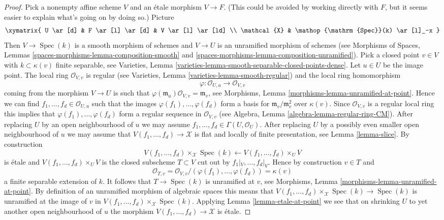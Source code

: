 \documentclass{stacks-project}
\theoremstyle{plain}
\theoremstyle{definition}
\theoremstyle{remark}
\numberwithin{equation}{subsection}
\def\Spec{\mathop{\mathrm{Spec}}}
\begin{document}
\begin{proof}
\medskip\noindent
Pick a nonempty affine scheme $V$ and an \'etale morphism $V \to F$.
(This could be avoided by working directly with $F$, but it seems easier
to explain what's going on by doing so.) Picture
$$
\xymatrix{
U \ar[d] & F  \ar[l] \ar[d] & V \ar[l] \ar[ld] \\
\mathcal{X} & \Spec(k) \ar[l]_-x
}
$$
Then $V \to \Spec(k)$ is a smooth morphism of schemes and $V \to U$ is an
unramified morphism of schemes (see
Morphisms of Spaces, Lemmas
\ref{spaces-morphisms-lemma-composition-smooth} and
\ref{spaces-morphisms-lemma-composition-unramified}).
Pick a closed point $v \in V$ with $k \subset \kappa(v)$ finite separable, see
Varieties, Lemma \ref{varieties-lemma-smooth-separable-closed-points-dense}.
Let $u \in U$ be the image point. The local ring
$\mathcal{O}_{V, v}$ is regular (see
Varieties, Lemma \ref{varieties-lemma-smooth-regular})
and the local ring homomorphism
$$
\varphi : \mathcal{O}_{U, u} \longrightarrow \mathcal{O}_{V, v}
$$
coming from the morphism $V \to U$ is such that
$\varphi(\mathfrak m_u)\mathcal{O}_{V, v} = \mathfrak m_v$, see
Morphisms, Lemma \ref{morphisms-lemma-unramified-at-point}.
Hence we can find $f_1, \ldots, f_d \in \mathcal{O}_{U, u}$
such that the images $\varphi(f_1), \ldots, \varphi(f_d)$
form a basis for $\mathfrak m_v/\mathfrak m_v^2$ over $\kappa(v)$.
Since $\mathcal{O}_{V, v}$ is a regular local ring this implies
that $\varphi(f_1), \ldots, \varphi(f_d)$ form a regular sequence
in $\mathcal{O}_{V, v}$ (see
Algebra, Lemma \ref{algebra-lemma-regular-ring-CM}).
After replacing $U$ by an open neighbourhood of $u$ we may assume
$f_1, \ldots, f_d \in \Gamma(U, \mathcal{O}_U)$. After replacing
$U$ by a possibly even smaller open neighbourhood of $u$ we may
assume that $V(f_1, \ldots, f_d) \to \mathcal{X}$ is flat and
locally of finite presentation, see
Lemma \ref{lemma-slice}.
By construction
$$
V(f_1, \ldots, f_d) \times_\mathcal{X} \Spec(k)
\longleftarrow
V(f_1, \ldots, f_d) \times_U V
$$
is \'etale and $V(f_1, \ldots, f_d) \times_U V$
is the closed subscheme $T \subset V$ cut out by $f_1|_V, \ldots, f_d|_V$.
Hence by construction $v \in T$ and
$$
\mathcal{O}_{T, v} =
\mathcal{O}_{V, v}/(\varphi(f_1), \ldots, \varphi(f_d)) = \kappa(v)
$$
a finite separable extension of $k$. It follows that $T \to \Spec(k)$
is unramified at $v$, see
Morphisms, Lemma \ref{morphisms-lemma-unramified-at-point}.
By definition of an unramified morphism of algebraic spaces this means that
$V(f_1, \ldots, f_d) \times_\mathcal{X} \Spec(k) \to \Spec(k)$
is unramified at the image of $v$ in
$V(f_1, \ldots, f_d) \times_\mathcal{X} \Spec(k)$.
Applying
Lemma \ref{lemma-etale-at-point}
we see that on shrinking $U$ to yet another open neighbourhood of $u$
the morphism $V(f_1, \ldots, f_d) \to \mathcal{X}$ is \'etale.


\end{proof}
\end{document}
